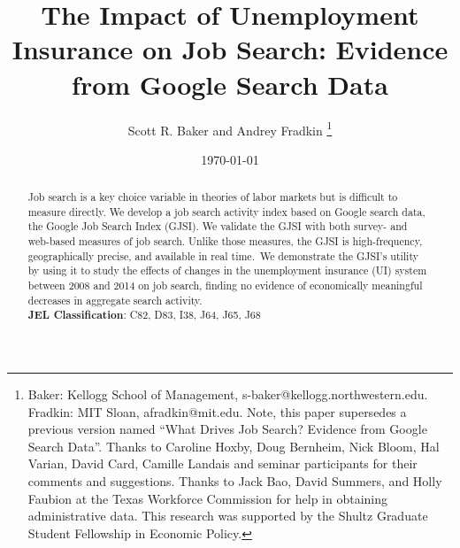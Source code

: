 \documentclass[12pt]{article}
\begin{document}
\title{\vspace{-25mm} The Impact of Unemployment Insurance on Job Search: Evidence from Google Search Data}

\begin{spacing}{2}

\author{Scott R. Baker and Andrey Fradkin
\thanks{%
Baker: Kellogg School of Management, s-baker@kellogg.northwestern.edu. Fradkin: MIT Sloan, afradkin@mit.edu. Note, this paper supersedes a previous version named ``What Drives Job Search? Evidence from Google Search Data''. Thanks to Caroline Hoxby, Doug Bernheim, Nick Bloom, Hal Varian, David Card, Camille Landais and seminar participants for their comments and suggestions. Thanks to Jack Bao, David Summers, and Holly Faubion at the Texas Workforce Commission for help in obtaining administrative data. This research was supported by the Shultz Graduate Student Fellowship in Economic Policy.}}

\date{\today}
\maketitle


\begin{abstract}
Job search is a key choice variable in theories of labor markets but is difficult to measure directly. We develop a job search activity index based on Google search data, the Google Job Search Index (GJSI). We validate the GJSI with both survey- and web-based measures of job search. Unlike those measures, the GJSI is high-frequency, geographically precise, and available in real time. We demonstrate the GJSI's utility by using it to study the effects of changes in the unemployment insurance (UI) system between 2008 and 2014 on job search, finding no evidence of economically meaningful decreases in aggregate search activity. \\
\textbf{JEL Classification}: C82, D83, I38, J64, J65, J68
\end{abstract}

\clearpage




\end{spacing}
\end{document}
